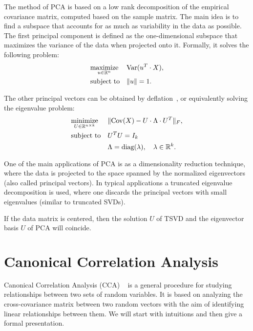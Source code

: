 The method of PCA is based on a low rank decomposition of the empirical covariance matrix, computed based on the sample matrix. The main
idea is to find a subspace that accounts for as much as variability in the data as possible. The first principal component is defined
as the one-dimensional subspace that maximizes the variance of the data when projected onto it. Formally, it solves the following problem:
\begin{equation}\label{eq:background:pca:single}
\begin{aligned}
& \underset{u \in \mathbb{R}^{n}}{\text{maximize}}
& & \textnormal{Var}(u^T \cdot X), \\
& \text{subject to}
& & \lVert u\rVert = 1.
\end{aligned}
\end{equation}


The other principal vectors can be obtained by deflation~\cite{shawe-taylor04kernel}, or equivalently solving the eigenvalue problem:
\begin{equation}\label{eq:background:pca:opt}
\begin{aligned}
& \underset{U \in \mathbb{R}^{n \times k}}{\text{minimize}}
& & \lVert\text{Cov}(X) - U \cdot \Lambda \cdot U^T\rVert_F, \\
& \text{subject to}
& & U^TU = I_k \\
& & & \Lambda = \textnormal{diag}(\lambda), \quad \lambda \in \mathbb{R}^k.
\end{aligned}
\end{equation}

One of the main applications of PCA is as a dimensionality reduction technique, where the data is projected to the space
spanned by the normalized eigenvectors (also called principal vectors). In typical applications a truncated eigenvalue decomposition 
is used, where one discards the principal vectors with small eigenvalues (similar to truncated SVDs).

If the data matrix is centered, then the solution $U$ of TSVD and the eigenvector basis $U$ of PCA will coincide.


\section{Canonical Correlation Analysis}\label{chap:background:cca}

Canonical Correlation Analysis (CCA) ~\cite{Hotelling} is a general procedure for studying
relationships between two sets of random variables. It is based on analyzing the
cross-covariance matrix between two random vectors with the aim of identifying
linear relationships between them. We will start with intuitions and then give a formal presentation.

